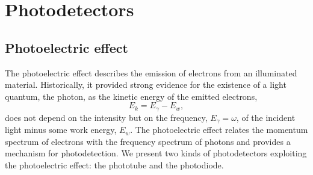 \section{Photodetectors}\label{sec:photodetectors}




\subsection{Photoelectric effect}

The photoelectric effect describes the emission of electrons from an illuminated material.
Historically, it provided strong evidence for the existence of a light quantum, the photon, as the kinetic energy of the emitted electrons,
\begin{equation}
	E_k
	=
	E_\gamma
	-
	E_w
	\label{eq:photoelectric_effect}
	,
\end{equation}
does not depend on the intensity but on the frequency, $E_\gamma=\omega$, of the incident light minus some work energy, $E_w$.
The photoelectric effect relates the momentum spectrum of electrons with the frequency spectrum of photons and provides a mechanism for photodetection.
We present two kinds of photodetectors exploiting the photoelectric effect: the phototube and the photodiode.

